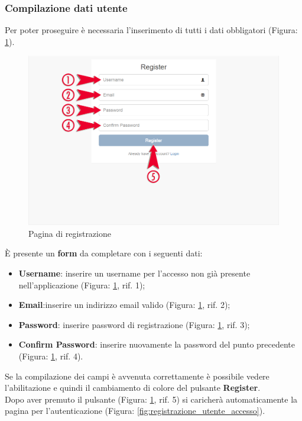 		\pagebreak
		\subsubsection{Compilazione dati utente} %
		\label{sec:compilazioni_dati_utente}
			Per poter proseguire è necessaria l'inserimento di tutti i dati obbligatori (Figura: \ref{fig:pagina_di_registrazione}).
			\begin{figure}[H]
				\centering
				\centerline{\includegraphics[width=14cm]{images/registrazione_utente.png}}
				\caption{Pagina di registrazione}
				\label{fig:pagina_di_registrazione}
			\end{figure}
			È presente un \textbf{form}\gloss{} da completare con i seguenti dati:
			\begin{itemize}
				\item \textbf{Username}: inserire un username per l'accesso non già presente nell'applicazione (Figura: \ref{fig:pagina_di_registrazione}, rif. 1);
				\item \textbf{Email}:inserire un indirizzo email valido (Figura: \ref{fig:pagina_di_registrazione}, rif. 2);
				\item \textbf{Password}: inserire password di registrazione (Figura: \ref{fig:pagina_di_registrazione}, rif. 3);
				\item \textbf{Confirm Password}: inserire nuovamente la password del punto precedente (Figura: \ref{fig:pagina_di_registrazione}, rif. 4).
			\end{itemize}
			Se la compilazione dei campi è avvenuta correttamente è possibile vedere l'abilitazione e quindi il cambiamento di colore del pulsante \textbf{Register}.\\
			Dopo aver premuto il pulsante (Figura: \ref{fig:pagina_di_registrazione}, rif. 5) si caricherà automaticamente la pagina per l'autenticazione\gloss{} (Figura: \ref{fig:registrazione_utente_accesso}).

